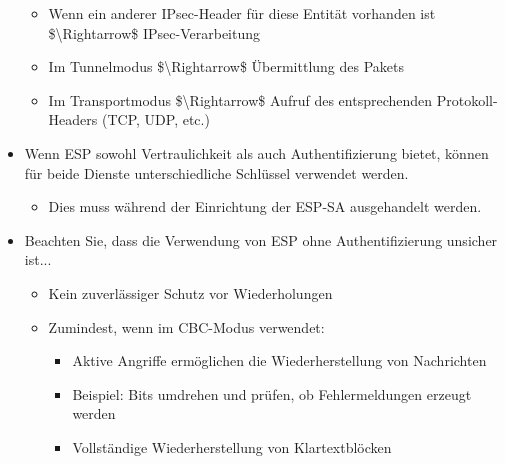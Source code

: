 \documentclass[a4paper]{article}
\begin{document}
\begin{multicols}{3}
\begin{itemize}
              \begin{itemize}
                  \item
                        Wenn ein anderer IPsec-Header für diese Entität vorhanden ist
                        \$\textbackslash Rightarrow\$ IPsec-Verarbeitung
                  \item
                        Im Tunnelmodus \$\textbackslash Rightarrow\$ Übermittlung des Pakets
                  \item
                        Im Transportmodus \$\textbackslash Rightarrow\$ Aufruf des
                        entsprechenden Protokoll-Headers (TCP, UDP, etc.)
              \end{itemize}
        \item
              Wenn ESP sowohl Vertraulichkeit als auch Authentifizierung bietet,
              können für beide Dienste unterschiedliche Schlüssel verwendet werden.

              \begin{itemize}
                  \item
                        Dies muss während der Einrichtung der ESP-SA ausgehandelt werden.
              \end{itemize}
        \item
              Beachten Sie, dass die Verwendung von ESP ohne Authentifizierung
              unsicher ist...

              \begin{itemize}
                  \item
                        Kein zuverlässiger Schutz vor Wiederholungen
                  \item
                        Zumindest, wenn im CBC-Modus verwendet:

                        \begin{itemize}
                            \item
                                  Aktive Angriffe ermöglichen die Wiederherstellung von Nachrichten
                            \item
                                  Beispiel: Bits umdrehen und prüfen, ob Fehlermeldungen erzeugt
                                  werden
                            \item
                                  Vollständige Wiederherstellung von Klartextblöcken
                        \end{itemize}
              \end{itemize}
    \end{itemize}



\end{multicols}
\end{document}
